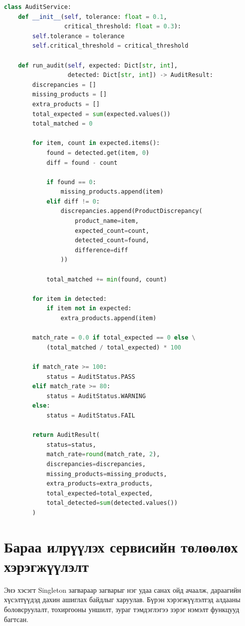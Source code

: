\begin{lstlisting}[language=Python, caption=AuditService-ийн үндсэн аудитын функц]
class AuditService:
    def __init__(self, tolerance: float = 0.1,
                 critical_threshold: float = 0.3):
        self.tolerance = tolerance
        self.critical_threshold = critical_threshold

    def run_audit(self, expected: Dict[str, int],
                  detected: Dict[str, int]) -> AuditResult:
        discrepancies = []
        missing_products = []
        extra_products = []
        total_expected = sum(expected.values())
        total_matched = 0

        for item, count in expected.items():
            found = detected.get(item, 0)
            diff = found - count

            if found == 0:
                missing_products.append(item)
            elif diff != 0:
                discrepancies.append(ProductDiscrepancy(
                    product_name=item,
                    expected_count=count,
                    detected_count=found,
                    difference=diff
                ))

            total_matched += min(found, count)

        for item in detected:
            if item not in expected:
                extra_products.append(item)

        match_rate = 0.0 if total_expected == 0 else \
            (total_matched / total_expected) * 100

        if match_rate >= 100:
            status = AuditStatus.PASS
        elif match_rate >= 80:
            status = AuditStatus.WARNING
        else:
            status = AuditStatus.FAIL

        return AuditResult(
            status=status,
            match_rate=round(match_rate, 2),
            discrepancies=discrepancies,
            missing_products=missing_products,
            extra_products=extra_products,
            total_expected=total_expected,
            total_detected=sum(detected.values())
        )
\end{lstlisting}

\section{Бараа илрүүлэх сервисийн төлөөлөх хэрэгжүүлэлт}

Энэ хэсэгт Singleton загвараар загварыг нэг удаа санах ойд ачаалж, дараагийн хүсэлтүүдэд дахин ашиглах байдлыг харуулав. Бүрэн хэрэгжүүлэлтэд алдааны боловсруулалт, тохиргооны уншилт, зураг тэмдэглэгээ зэрэг нэмэлт функцууд багтсан.

